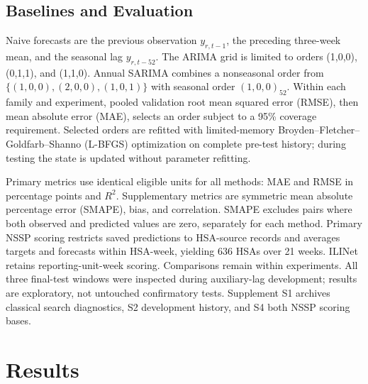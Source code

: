 \documentclass[conference,a4paper]{IEEEtran}
\begin{document}
\begin{table}[t]

\end{table}

\begin{table}[!t]

\end{table}

\subsection{Baselines and Evaluation}
Naive forecasts are the previous observation $y_{r,t-1}$, the preceding three-week mean, and the seasonal lag $y_{r,t-52}$. The ARIMA grid is limited to orders (1,0,0), (0,1,1), and (1,1,0). Annual SARIMA combines a nonseasonal order from $\{(1,0,0),(2,0,0),(1,0,1)\}$ with seasonal order $(1,0,0)_{52}$. Within each family and experiment, pooled validation root mean squared error (RMSE), then mean absolute error (MAE), selects an order subject to a 95\% coverage requirement. Selected orders are refitted with limited-memory Broyden--Fletcher--Goldfarb--Shanno (L-BFGS) optimization on complete pre-test history; during testing the state is updated without parameter refitting.

Primary metrics use identical eligible units for all methods: MAE and RMSE in percentage points and $R^2$. Supplementary metrics are symmetric mean absolute percentage error (SMAPE), bias, and correlation. SMAPE excludes pairs where both observed and predicted values are zero, separately for each method. Primary NSSP scoring restricts saved predictions to HSA-source records and averages targets and forecasts within HSA-week, yielding 636 HSAs over 21 weeks. ILINet retains reporting-unit-week scoring. Comparisons remain within experiments. All three final-test windows were inspected during auxiliary-lag development; results are exploratory, not untouched confirmatory tests. Supplement S1 archives classical search diagnostics, S2 development history, and S4 both NSSP scoring bases.

\begin{figure}[!t]

\end{figure}

\section{Results}
\end{document}
